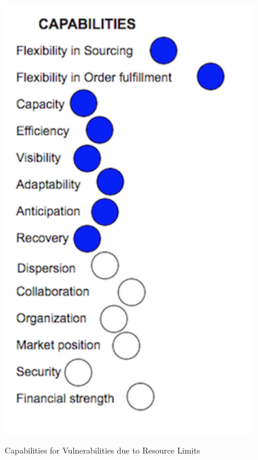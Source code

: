 \begin{figure}[H]
  \centering
  \includegraphics[width=4.5in]{figures/V3.png}\\
  \caption{Capabilities for Vulnerabilities due to Resource Limits}\label{V3}
\end{figure}  

